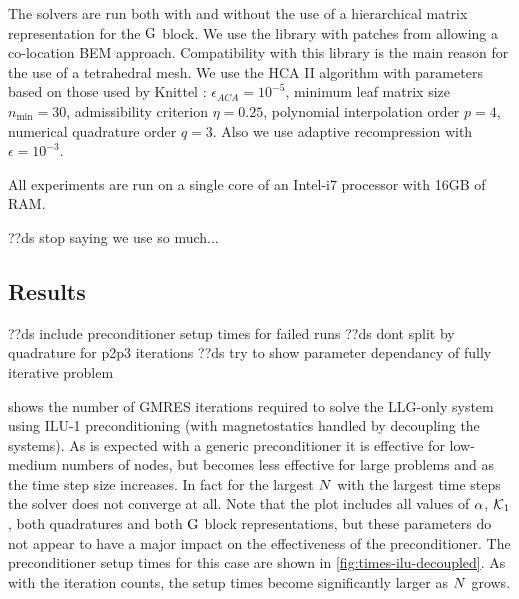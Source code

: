 The solvers are run both with and without the use of a hierarchical matrix representation for the $\mathrm{G}$ block.
We use the \hlib library with patches from \nmag allowing a co-location BEM approach.
Compatibility with this library is the main reason for the use of a tetrahedral mesh.
We use the HCA II algorithm with parameters based on those used by Knittel \cite{Knittel2011}:
$\epsilon_{ACA} = 10^{-5}$,
minimum leaf matrix size $n_{\text{min}}= 30$,
admissibility criterion $\eta = 0.25$,
polynomial interpolation order $p=4$,
numerical quadrature order $q=3$.
Also we use adaptive recompression with $\epsilon = 10^{-3}$.

All experiments are run on a single core of an Intel-i7 processor with 16GB of RAM.

??ds stop saying we use so much...

\subsection{Results}

??ds include preconditioner setup times for failed runs
??ds dont split by quadrature for p2p3 iterations
??ds try to show parameter dependancy of fully iterative problem





 shows the number of GMRES iterations required to solve the LLG-only system using ILU-1 preconditioning (with magnetostatics handled by decoupling the systems).
As is expected with a generic preconditioner it is effective for low-medium numbers of nodes, but becomes less effective for large problems and as the time step size increases.
In fact for the largest $N$ with the largest time steps the solver does not converge at all.
Note that the plot includes all values of $\alpha$, $\mathcal{K}_1$, both quadratures and both $\mathrm{G}$ block representations, but these parameters do not appear to have a major impact on the effectiveness of the preconditioner.
The preconditioner setup times for this case are shown in \cref{fig:times-ilu-decoupled}.
As with the iteration counts, the setup times become significantly larger as $N$ grows.

